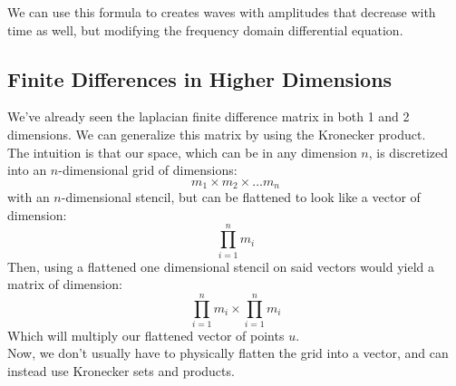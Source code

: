 \documentclass[12pt]{article}
\begin{document}
We can use this formula to creates waves
with amplitudes that decrease with time
as well, but modifying the frequency
domain differential equation. \\

\newpage

\subsection*{Finite Differences in Higher Dimensions}

We've already seen the laplacian
finite difference matrix in both 1 and 2
dimensions. We can generalize this matrix
by using the Kronecker product. \\
The intuition is that our space, which
can be in any dimension $n$,
is discretized into an $n$-dimensional grid
of dimensions:
\[ m_1 \times m_2 \times \dots m_n \] 
with an $n$-dimensional stencil,
but can be flattened to look like a vector
of dimension:
\[ \prod_{i=1}^n m_i \]
Then, using a flattened one dimensional
stencil on said vectors would yield
a matrix of dimension:
\[ \prod_{i=1}^n m_i \times \prod_{i=1}^n m_i \]
Which will multiply our flattened 
vector of points $u$. \\

Now, we don't usually have to physically
flatten the grid into a vector, and can
instead use Kronecker sets
and products. \\
\end{document}
